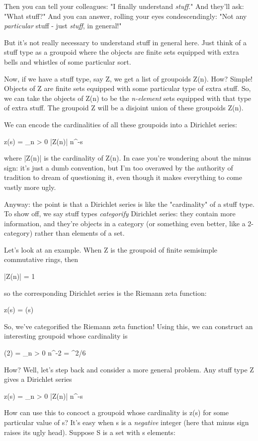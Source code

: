 Then you can tell your colleagues: "I finally understand
\emph{stuff}."  And they'll ask: "What stuff?"  And you can answer,
rolling your eyes condescendingly: "Not any \emph{particular} stuff -
just \emph{stuff}, in general!"

But it's not really necessary to understand stuff in general here.
Just think of a stuff type as a groupoid where the objects are finite
sets equipped with extra bells and whistles of some particular sort.

Now, if we have a stuff type, say Z, we get a list of groupoids Z(n).
How?  Simple! Objects of Z are finite sets equipped with some
particular type of extra stuff.  So, we can take the objects of Z(n)
to be the \emph{n-element} sets equipped with that type of extra
stuff.  The groupoid Z will be a disjoint union of these groupoids
Z(n).

We can encode the cardinalities of all these groupoids into a Dirichlet series:

z(s) = \sum_{n > 0} |Z(n)| n^{-s}

where |Z(n)| is the cardinality of Z(n).  In case you're wondering
about the minus sign: it's just a dumb convention, but I'm too
overawed by the authority of tradition to dream of questioning it,
even though it makes everything to come vastly more ugly.

Anyway: the point is that a Dirichlet series is like the "cardinality"
of a stuff type.  To show off, we say stuff types \emph{categorify}
Dirichlet series: they contain more information, and they're objects
in a category (or something even better, like a 2-category) rather
than elements of a set.

Let's look at an example.  When Z is the groupoid of finite semisimple
commutative rings, then

|Z(n)| = 1

so the corresponding Dirichlet series is the Riemann zeta function:

z(s) = \zeta (s)

So, we've categorified the Riemann zeta function!  Using this, we can
construct an interesting groupoid whose cardinality is

\zeta (2) = \sum_{n > 0} n^{-2} = \pi ^{2}/6

How?  Well, let's step back and consider a more general problem.  Any
stuff type Z gives a Dirichlet series

z(s) = \sum_{n > 0} |Z(n)| n^{-s}

How can use this to concoct a groupoid whose cardinality is z(s) for
some particular value of s?  It's easy when s is a \emph{negative}
integer (here that minus sign raises its ugly head).  Suppose S is a
set with s elements:

